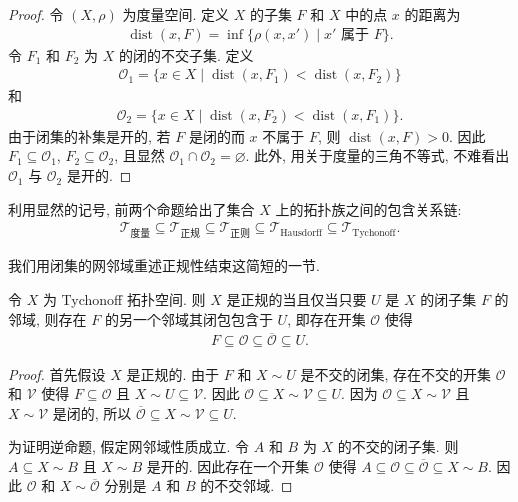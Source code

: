\documentclass[../../main.tex]{subfiles}
\begin{document}
\begin{proof}
令 $(X,\rho)$ 为度量空间. 定义 $X$ 的子集 $F$ 和 $X$ 中的点 $x$ 的距离为
\begin{align*}
\operatorname{dist}(x,F)=\inf\{\rho(x,x')\mid x'\text{ 属于 }F\}.
\end{align*}
令 $F_{1}$ 和 $F_{2}$ 为 $X$ 的闭的不交子集. 定义
\begin{align*}
\mathcal{O}_{1}=\{x\in X\mid\operatorname{dist}(x,F_{1})<\operatorname{dist}(x,F_{2})\}
\end{align*}
和
\begin{align*}
\mathcal{O}_{2}=\{x\in X\mid\operatorname{dist}(x,F_{2})<\operatorname{dist}(x,F_{1})\}.
\end{align*}
由于闭集的补集是开的, 若 $F$ 是闭的而 $x$ 不属于 $F$, 则 $\operatorname{dist}(x,F)>0$. 因此 $F_{1}\subseteq\mathcal{O}_{1}$, $F_{2}\subseteq\mathcal{O}_{2}$, 且显然 $\mathcal{O}_{1}\cap\mathcal{O}_{2}=\varnothing$. 此外, 用关于度量的三角不等式, 不难看出 $\mathcal{O}_{1}$ 与 $\mathcal{O}_{2}$ 是开的.
\end{proof}

利用显然的记号, 前两个命题给出了集合 $X$ 上的拓扑族之间的包含关系链:
\begin{align*}
\mathcal{T}_{\text{度量}}\subseteq\mathcal{T}_{\text{正规}}\subseteq\mathcal{T}_{\text{正则}}\subseteq\mathcal{T}_{\text{Hausdorff}}\subseteq\mathcal{T}_{\text{Tychonoff}}.
\end{align*}

我们用闭集的网邻域重述正规性结束这简短的一节.

\begin{proposition}\label{proposition:ch11-正规网邻域}
令 $X$ 为 Tychonoff 拓扑空间. 则 $X$ 是正规的当且仅当只要 $U$ 是 $X$ 的闭子集 $F$ 的邻域, 则存在 $F$ 的另一个邻域其闭包包含于 $U$, 即存在开集 $\mathcal{O}$ 使得
\begin{align*}
F\subseteq\mathcal{O}\subseteq\overline{\mathcal{O}}\subseteq U.
\end{align*}
\end{proposition}

\begin{proof}
首先假设 $X$ 是正规的. 由于 $F$ 和 $X\sim U$ 是不交的闭集, 存在不交的开集 $\mathcal{O}$ 和 $\mathcal{V}$ 使得 $F\subseteq\mathcal{O}$ 且 $X\sim U\subseteq\mathcal{V}$. 因此 $\mathcal{O}\subseteq X\sim\mathcal{V}\subseteq U$. 因为 $\mathcal{O}\subseteq X\sim\mathcal{V}$ 且 $X\sim\mathcal{V}$ 是闭的, 所以 $\overline{\mathcal{O}}\subseteq X\sim\mathcal{V}\subseteq U$.

为证明逆命题, 假定网邻域性质成立. 令 $A$ 和 $B$ 为 $X$ 的不交的闭子集. 则 $A\subseteq X\sim B$ 且 $X\sim B$ 是开的. 因此存在一个开集 $\mathcal{O}$ 使得 $A\subseteq\mathcal{O}\subseteq\overline{\mathcal{O}}\subseteq X\sim B$. 因此 $\mathcal{O}$ 和 $X\sim\overline{\mathcal{O}}$ 分别是 $A$ 和 $B$ 的不交邻域.
\end{proof}
\end{document}
